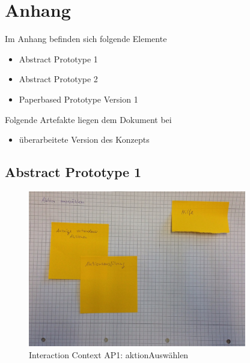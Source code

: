

\section*{Anhang}
Im Anhang befinden sich folgende Elemente
\begin{itemize}
   \item 
   Abstract Prototype 1

   \item 
   Abstract Prototype 2

   \item 
   Paperbased Prototype Version 1
  
\end{itemize}

\vspace{1cm}	
Folgende Artefakte liegen dem Dokument bei
\begin{itemize}
   \item überarbeitete Version des Konzepts
\end{itemize}
	

\newpage
\subsection{Abstract Prototype 1}

\begin{figure}[H]
\centering
\includegraphics[width=0.85\textwidth]{./images/abstract/version1/aktionAuswaehlen.JPG}
\caption{Interaction Context AP1: aktionAuswählen}
\label{interfaceContents20}
\end{figure}


